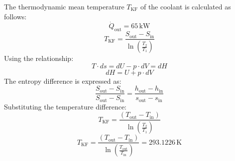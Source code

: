 The thermodynamic mean temperature \( T_{\text{KF}} \) of the coolant is calculated as follows:  
\[
\dot{Q}_{\text{out}} = 65 \, \text{kW}
\]  
\[
T_{\text{KF}} = \frac{S_{\text{out}} - S_{\text{in}}}{\ln \left( \frac{T_2}{T_1} \right)}
\]  
Using the relationship:  
\[
T \cdot ds = dU - p \cdot dV = dH
\]  
\[
dH = U + p \cdot dV
\]  
The entropy difference is expressed as:  
\[
\frac{S_{\text{out}} - S_{\text{in}}}{S_{\text{out}} - S_{\text{in}}} = \frac{h_{\text{out}} - h_{\text{in}}}{s_{\text{out}} - s_{\text{in}}}
\]  
Substituting the temperature difference:  
\[
T_{\text{KF}} = \frac{(T_{\text{out}} - T_{\text{in}})}{\ln \left( \frac{T_2}{T_1} \right)}
\]  
\[
T_{\text{KF}} = \frac{(T_{\text{out}} - T_{\text{in}})}{\ln \left( \frac{T_{\text{out}}}{T_{\text{in}}} \right)} = 293.1226 \, \text{K}
\]